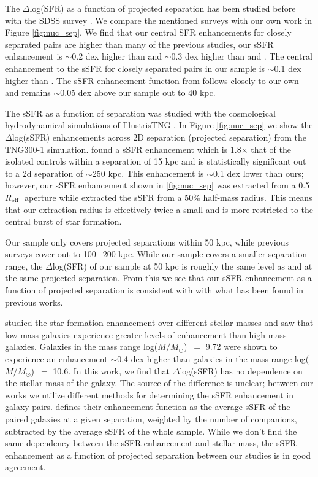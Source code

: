 \documentclass[iop,revtex4,twocolumn,apj,numberedappendix,appendixfloats]{emulateapj}
\newcommand{\reff}{$R_{\rm eff}$}
\newcommand{\logm}{log($M/M_{\odot}$)}
\begin{document}
The $\Delta$log(SFR) as a function of projected separation has been studied before with the SDSS survey \citep{Ellison:2008, Li:2008, Patton:2013, Scudder:2012, Bustamante:2020}. We compare the mentioned surveys with our own work in Figure \ref{fig:nuc_sep}. We find that our central SFR enhancements for closely separated pairs are higher than many of the previous studies, our sSFR enhancement is $\sim$0.2 dex higher than \citet{Scudder:2012} and $\sim$0.3 dex higher than \citet{Ellison:2008} and \citet{Bustamante:2020}. The central enhancement to the sSFR for closely separated pairs in our sample is $\sim$0.1 dex higher than \citet{Patton:2013}. The sSFR enhancement function from \citet{Li:2008} follows closely to our own and remains $\sim$0.05 dex above our sample out to 40 kpc.  

The sSFR as a function of separation was studied with the cosmological hydrodynamical simulations of IllustrisTNG \citep{Patton:2020}. In Figure \ref{fig:nuc_sep} we show the $\Delta$log(sSFR) enhancements across 2D separation (projected separation) from the TNG300-1 simulation. \citet{Patton:2020} found a sSFR enhancement which is 1.8$\times$ that of the isolated controls within a separation of 15 kpc and is statistically significant out to a 2d separation of $\sim$250 kpc. This enhancement is $\sim$0.1 dex lower than ours; however, our sSFR enhancement shown in \ref{fig:nuc_sep} was extracted from a 0.5\reff\ aperture while \citet{Patton:2020} extracted the sSFR from a 50\% half-mass radius. This means that our extraction radius is effectively twice a small and is more restricted to the central burst of star formation. 

Our sample only covers projected separations within 50 kpc, while previous surveys cover out to 100$-$200 kpc. While our sample covers a smaller separation range, the $\Delta$log(SFR) of our sample at 50 kpc is roughly the same level as \citet{Scudder:2012} and \citet{Patton:2013} at the same projected separation. From this we see that our sSFR enhancement as a function of projected separation is consistent with with what has been found in previous works. 

\citet{Li:2008} studied the star formation enhancement over different stellar masses and saw that low mass galaxies experience greater levels of enhancement than high mass galaxies.  Galaxies in the mass range \logm\ $=$ 9.72 were shown to experience an enhancement $\sim$0.4 dex higher than galaxies in the mass range \logm\ $=$ 10.6. In this work, we find that $\Delta$log(sSFR) has no dependence on the stellar mass of the galaxy. The source of the difference is unclear; between our works we utilize different methods for determining the sSFR enhancement in galaxy pairs. \citet{Li:2008} defines their enhancement function as the average sSFR of the paired galaxies at a given separation, weighted by the number of companions, subtracted by the average sSFR of the whole sample. While we don't find the same dependency between the sSFR enhancement and stellar mass, the sSFR enhancement as a function of projected separation between our studies is in good agreement.
\end{document}
